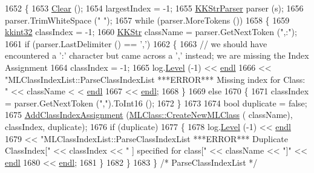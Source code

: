 \begin{DoxyCode}
1652 \{
1653   \hyperlink{class_k_k_m_l_l_1_1_m_l_class_index_list_a6708769cb9c2e8773580c1247f1dcdc5}{Clear} ();
1654   largestIndex = -1;
1655   \hyperlink{class_k_k_b_1_1_k_k_str_parser}{KKStrParser}  parser (s);
1656   parser.TrimWhiteSpace (\textcolor{stringliteral}{" "});
1657   \textcolor{keywordflow}{while}  (parser.MoreTokens ())
1658   \{
1659     \hyperlink{namespace_k_k_b_a8fa4952cc84fda1de4bec1fbdd8d5b1b}{kkint32}  classIndex = -1;
1660     \hyperlink{class_k_k_b_1_1_k_k_str}{KKStr} className = parser.GetNextToken (\textcolor{stringliteral}{",:"});
1661     \textcolor{keywordflow}{if}  (parser.LastDelimiter () == \textcolor{charliteral}{','})
1662     \{
1663       \textcolor{comment}{// we should have encountered a ':' character but came across a ',' instead;  we are missing the
       Index Assignment}
1664       classIndex = -1;
1665       log.\hyperlink{class_k_k_b_1_1_run_log_a32cf761d7f2e747465fd80533fdbb659}{Level} (-1) << \hyperlink{namespace_k_k_b_ad1f50f65af6adc8fa9e6f62d007818a8}{endl} 
1666         << \textcolor{stringliteral}{"MLClassIndexList::ParseClassIndexList   ***ERROR***   Missing index for Class: "} << className <
      < \hyperlink{namespace_k_k_b_ad1f50f65af6adc8fa9e6f62d007818a8}{endl}
1667         << \hyperlink{namespace_k_k_b_ad1f50f65af6adc8fa9e6f62d007818a8}{endl};
1668     \}
1669     \textcolor{keywordflow}{else}
1670     \{
1671       classIndex = parser.GetNextToken (\textcolor{stringliteral}{","}).ToInt16 ();
1672     \}
1673 
1674     \textcolor{keywordtype}{bool}  duplicate = \textcolor{keyword}{false};
1675     \hyperlink{class_k_k_m_l_l_1_1_m_l_class_index_list_a203e6905f4f979916bc04ba18e2480df}{AddClassIndexAssignment} (\hyperlink{class_k_k_m_l_l_1_1_m_l_class_a9fd24c617c42d89afc92414575e00e9a}{MLClass::CreateNewMLClass} (
      className), classIndex, duplicate);
1676     \textcolor{keywordflow}{if}  (duplicate)
1677     \{
1678       log.\hyperlink{class_k_k_b_1_1_run_log_a32cf761d7f2e747465fd80533fdbb659}{Level} (-1) << \hyperlink{namespace_k_k_b_ad1f50f65af6adc8fa9e6f62d007818a8}{endl}
1679         << \textcolor{stringliteral}{"MLClassIndexList::ParseClassIndexList   ***ERROR***   Duplicate ClassIndex["} << classIndex << \textcolor{stringliteral}{"
      ] specified for class["} << className << \textcolor{stringliteral}{"]"} << \hyperlink{namespace_k_k_b_ad1f50f65af6adc8fa9e6f62d007818a8}{endl}
1680         << \hyperlink{namespace_k_k_b_ad1f50f65af6adc8fa9e6f62d007818a8}{endl};
1681     \}
1682   \}
1683 \}  \textcolor{comment}{/* ParseClassIndexList */}
\end{DoxyCode}
